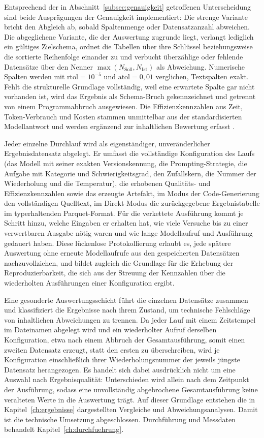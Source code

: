 Entsprechend der in Abschnitt~\ref{subsec:genauigkeit} getroffenen Unterscheidung sind beide Ausprägungen der Genauigkeit implementiert: Die strenge Variante bricht den Abgleich ab, sobald Spaltenmenge oder Datensatzanzahl abweichen. Die abgeglichene Variante, die der Auswertung zugrunde liegt, verlangt lediglich ein gültiges Zielschema, ordnet die Tabellen über ihre Schlüssel beziehungsweise die sortierte Reihenfolge einander zu und verbucht überzählige oder fehlende Datensätze über den Nenner $\max(N_{\mathrm{Soll}},N_{\mathrm{Ist}})$ als Abweichung. Numerische Spalten werden mit $\mathrm{rtol}=10^{-5}$ und $\mathrm{atol}=0{,}01$ verglichen, Textspalten exakt. Fehlt die strukturelle Grundlage vollständig, weil eine erwartete Spalte gar nicht vorhanden ist, wird das Ergebnis als Schema-Bruch gekennzeichnet und getrennt von einem Programmabbruch ausgewiesen. Die Effizienzkennzahlen aus Zeit, Token-Verbrauch und Kosten stammen unmittelbar aus der standardisierten Modellantwort und werden ergänzend zur inhaltlichen Bewertung erfasst \autocite{changEfficientPromptingMethods2024,2026AIIndex}.

Jeder einzelne Durchlauf wird als eigenständiger, unveränderlicher Ergebnisdatensatz abgelegt. Er umfasst die vollständige Konfiguration des Laufs (das Modell mit seiner exakten Versionskennung, die Prompting-Strategie, die Aufgabe mit Kategorie und Schwierigkeitsgrad, den Zufallskern, die Nummer der Wiederholung und die Temperatur), die erhobenen Qualitäts- und Effizienzkennzahlen sowie das erzeugte Artefakt, im Modus der Code-Generierung den vollständigen Quelltext, im Direkt-Modus die zurückgegebene Ergebnistabelle im typerhaltenden Parquet-Format. Für die verkettete Ausführung kommt je Schritt hinzu, welche Eingaben er erhalten hat, wie viele Versuche bis zu einer verwertbaren Ausgabe nötig waren und wie lange Modellaufruf und Ausführung gedauert haben. Diese lückenlose Protokollierung erlaubt es, jede spätere Auswertung ohne erneute Modellaufrufe aus den gespeicherten Datensätzen nachzuvollziehen, und bildet zugleich die Grundlage für die Erhebung der Reproduzierbarkeit, die sich aus der Streuung der Kennzahlen über die wiederholten Ausführungen einer Konfiguration ergibt.

Eine gesonderte Auswertungsschicht führt die einzelnen Datensätze zusammen und klassifiziert die Ergebnisse nach ihrem Zustand, um technische Fehlschläge von inhaltlichen Abweichungen zu trennen. Da jeder Lauf mit einem Zeitstempel im Dateinamen abgelegt wird und ein wiederholter Aufruf derselben Konfiguration, etwa nach einem Abbruch der Gesamtausführung, somit einen zweiten Datensatz erzeugt, statt den ersten zu überschreiben, wird je Konfiguration einschließlich ihrer Wiederholungsnummer der jeweils jüngste Datensatz herangezogen. Es handelt sich dabei ausdrücklich nicht um eine Auswahl nach Ergebnisqualität: Unterschieden wird allein nach dem Zeitpunkt der Ausführung, sodass eine unvollständig abgebrochene Gesamtausführung keine veralteten Werte in die Auswertung trägt. Auf dieser Grundlage entstehen die in Kapitel~\ref{ch:ergebnisse} dargestellten Vergleiche und Abweichungsanalysen. Damit ist die technische Umsetzung abgeschlossen. Durchführung und Messdaten behandelt Kapitel~\ref{ch:durchfuehrung}.
